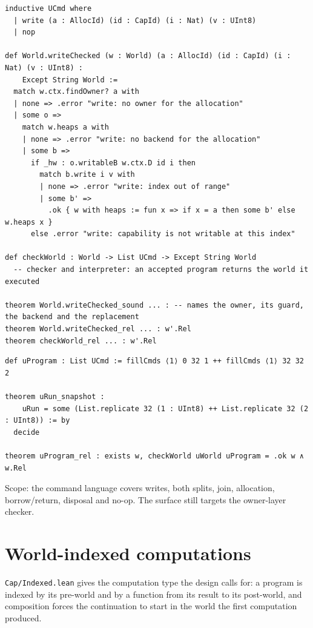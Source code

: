 \documentclass[10pt,a4paper]{article}
\newcommand{\file}[1]{\texttt{\small #1}}
\begin{document}
\begin{lstlisting}[caption={\file{Cap/Unified.lean}.}]
inductive UCmd where
  | write (a : AllocId) (id : CapId) (i : Nat) (v : UInt8)
  | nop

def World.writeChecked (w : World) (a : AllocId) (id : CapId) (i : Nat) (v : UInt8) :
    Except String World :=
  match w.ctx.findOwner? a with
  | none => .error "write: no owner for the allocation"
  | some o =>
    match w.heaps a with
    | none => .error "write: no backend for the allocation"
    | some b =>
      if _hw : o.writableB w.ctx.D id i then
        match b.write i v with
        | none => .error "write: index out of range"
        | some b' =>
          .ok { w with heaps := fun x => if x = a then some b' else w.heaps x }
      else .error "write: capability is not writable at this index"

def checkWorld : World -> List UCmd -> Except String World
  -- checker and interpreter: an accepted program returns the world it executed

theorem World.writeChecked_sound ... : -- names the owner, its guard, the backend and the replacement
theorem World.writeChecked_rel ... : w'.Rel
theorem checkWorld_rel ... : w'.Rel
\end{lstlisting}

\begin{lstlisting}[caption={The 64-byte run through the certified route.}]
def uProgram : List UCmd := fillCmds ⟨1⟩ 0 32 1 ++ fillCmds ⟨1⟩ 32 32 2

theorem uRun_snapshot :
    uRun = some (List.replicate 32 (1 : UInt8) ++ List.replicate 32 (2 : UInt8)) := by
  decide

theorem uProgram_rel : exists w, checkWorld uWorld uProgram = .ok w ∧ w.Rel
\end{lstlisting}

Scope: the command language covers writes, both splits, join, allocation,
borrow/return, disposal and no-op. The surface still targets the owner-layer
checker.

\section{World-indexed computations}

\file{Cap/Indexed.lean} gives the computation type the design calls for: a
program is indexed by its pre-world and by a function from its result to its
post-world, and composition forces the continuation to start in the world the
first computation produced.
\end{document}
